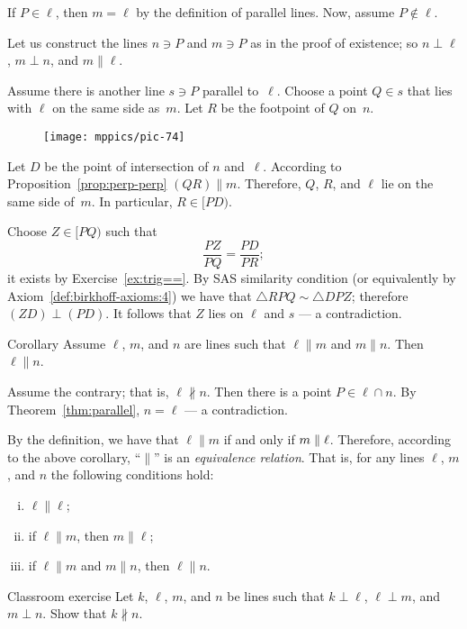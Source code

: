 If $P\in\ell$, then $m=\ell$ by the definition of parallel lines.
Now, assume $P\notin\ell$.

Let us construct the lines $n\ni P$ and $m\ni P$ as in the proof of existence; so $n\perp \ell$, $m\perp n$, and $m\parallel \ell$.

Assume there is another line $s\ni P$ parallel to~$\ell$.
Choose a point $Q\in s$ that lies with $\ell$ on the same side as~$m$.
Let $R$ be the footpoint of $Q$ on~$n$.

\begin{figure}[!ht]
\centering
\texttt{[image: mppics/pic-74]}
\end{figure}

Let $D$ be the point of intersection of $n$ and~$\ell$.
According to Proposition~\ref{prop:perp-perp} $(QR)\parallel m$. 
Therefore, $Q$, $R$, and $\ell$ lie on the same side of~$m$. 
In particular, $R\in [P D)$.

Choose $Z\in [P Q)$ such that 
$$\frac{PZ}{PQ}=\frac{PD}{PR};$$
it exists by Exercise~\ref{ex:trig==}.
By SAS similarity condition (or equivalently by Axiom~\ref{def:birkhoff-axioms:4})
we have that $\triangle RPQ\sim \triangle DPZ$;
therefore $(Z D)\perp(P D)$.
It follows that $Z$ lies on $\ell$ and $s$ --- a contradiction.\qeds

\begin{thm}{Corollary}\label{cor:parallel-1}
Assume $\ell$, $m$, and $n$ are lines
such that $\ell\parallel m$ and $m\parallel n$.
Then $\ell\parallel n$.
\end{thm}

Assume the contrary; that is, $\ell\nparallel n$.
Then there is a point $P\in \ell\cap n$.
By Theorem~\ref{thm:parallel},
$n=\ell$ --- a contradiction.
\qeds

By the definition, we have that $\ell\parallel m$ if and only if $m\parallel \ell$.
Therefore, according to the above corollary, ``$\parallel$'' is an 
\emph{equivalence relation}.
That is, for any lines $\ell$, $m$, and $n$ the following conditions hold:
\begin{enumerate}[(i)]
\item $\ell\parallel \ell$;
\item if $\ell\parallel m$, then $m\parallel \ell$;
\item if $\ell\parallel m$ and $m\parallel n$, then 
$\ell\parallel n$.
\end{enumerate}

\begin{thm}{Classroom exercise}\label{ex:perp-perp}
Let $k$, $\ell$, $m$, and $n$ be lines such that $k\perp \ell$, $\ell\perp m$, and $m\perp n$.
Show that $k\nparallel n$.
\end{thm}

